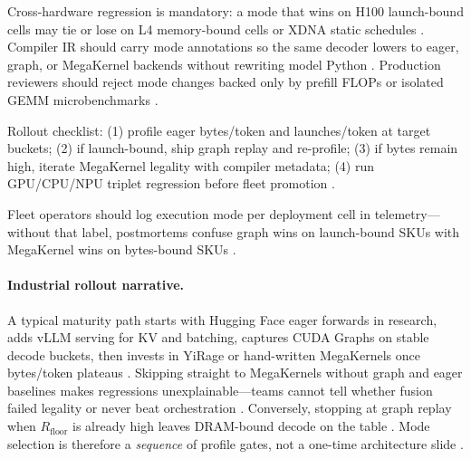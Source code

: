 Cross-hardware regression is mandatory: a mode that wins on H100 launch-bound cells may tie or lose on L4 memory-bound cells or XDNA static schedules \citep{memoryfloor2026,amd2024xdna,semianalysis2024tma}. Compiler IR should carry mode annotations so the same decoder lowers to eager, graph, or MegaKernel backends without rewriting model Python \citep{yirage2026,chen2020compilerbasedhardw,dlbook}. Production reviewers should reject mode changes backed only by prefill FLOPs or isolated GEMM microbenchmarks \citep{patel2025llminference,taxbreak2026,dao2023flashdecoding}.

\begin{example}
Rollout checklist: (1) profile eager bytes/token and launches/token at target buckets; (2) if launch-bound, ship graph replay and re-profile; (3) if bytes remain high, iterate MegaKernel legality with compiler metadata; (4) run GPU/CPU/NPU triplet regression before fleet promotion \citep{taxbreak2026,memoryfloor2026,yirage2026,amd2024xdna,chen2020compilerbasedhardw,patel2025llminference,nvidia2024cudagraphs,kwon2023vllm,liu2024deepseekv3,dlbook}.
\end{example}

Fleet operators should log execution mode per deployment cell in telemetry---without that label, postmortems confuse graph wins on launch-bound SKUs with MegaKernel wins on bytes-bound SKUs \citep{patel2025llminference,taxbreak2026,memoryfloor2026,yirage2026,semianalysis2024tma,amd2024aie,dao2022flashattention,chen2020compilerbasedhardw,nvidia2024cudagraphs,kwon2023vllm,liu2024deepseekv3,dlbook,dao2023flashdecoding}.

\paragraph{Industrial rollout narrative.} A typical maturity path starts with Hugging Face eager forwards in research, adds vLLM serving for KV and batching, captures CUDA Graphs on stable decode buckets, then invests in YiRage or hand-written MegaKernels once bytes/token plateaus \citep{kwon2023vllm,nvidia2024cudagraphs,yirage2026,taxbreak2026,memoryfloor2026,patel2025llminference}. Skipping straight to MegaKernels without graph and eager baselines makes regressions unexplainable---teams cannot tell whether fusion failed legality or never beat orchestration \citep{chen2020compilerbasedhardw,amd2024xdna,amd2024aie,semianalysis2024tma,dao2022flashattention,liu2024deepseekv3,dlbook,dao2023flashdecoding}. Conversely, stopping at graph replay when $R_{\mathrm{floor}}$ is already high leaves DRAM-bound decode on the table \citep{memoryfloor2026,taxbreak2026}. Mode selection is therefore a \emph{sequence} of profile gates, not a one-time architecture slide \citep{patel2025llminference,yirage2026,nvidia2024cudagraphs,kwon2023vllm,amd2024xdna,chen2020compilerbasedhardw,dlbook}.

